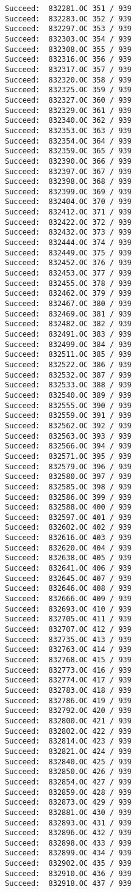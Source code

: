 \documentclass[11pt]{article}
\begin{document}
\begin{verbatim}
Succeed:  832281.OC 351 / 939
Succeed:  832283.OC 352 / 939
Succeed:  832297.OC 353 / 939
Succeed:  832303.OC 354 / 939
Succeed:  832308.OC 355 / 939
Succeed:  832316.OC 356 / 939
Succeed:  832317.OC 357 / 939
Succeed:  832320.OC 358 / 939
Succeed:  832325.OC 359 / 939
Succeed:  832327.OC 360 / 939
Succeed:  832329.OC 361 / 939
Succeed:  832340.OC 362 / 939
Succeed:  832353.OC 363 / 939
Succeed:  832354.OC 364 / 939
Succeed:  832359.OC 365 / 939
Succeed:  832390.OC 366 / 939
Succeed:  832397.OC 367 / 939
Succeed:  832398.OC 368 / 939
Succeed:  832399.OC 369 / 939
Succeed:  832404.OC 370 / 939
Succeed:  832412.OC 371 / 939
Succeed:  832422.OC 372 / 939
Succeed:  832432.OC 373 / 939
Succeed:  832444.OC 374 / 939
Succeed:  832449.OC 375 / 939
Succeed:  832452.OC 376 / 939
Succeed:  832453.OC 377 / 939
Succeed:  832455.OC 378 / 939
Succeed:  832462.OC 379 / 939
Succeed:  832467.OC 380 / 939
Succeed:  832469.OC 381 / 939
Succeed:  832482.OC 382 / 939
Succeed:  832491.OC 383 / 939
Succeed:  832499.OC 384 / 939
Succeed:  832511.OC 385 / 939
Succeed:  832522.OC 386 / 939
Succeed:  832532.OC 387 / 939
Succeed:  832533.OC 388 / 939
Succeed:  832540.OC 389 / 939
Succeed:  832555.OC 390 / 939
Succeed:  832559.OC 391 / 939
Succeed:  832562.OC 392 / 939
Succeed:  832563.OC 393 / 939
Succeed:  832566.OC 394 / 939
Succeed:  832571.OC 395 / 939
Succeed:  832579.OC 396 / 939
Succeed:  832580.OC 397 / 939
Succeed:  832585.OC 398 / 939
Succeed:  832586.OC 399 / 939
Succeed:  832588.OC 400 / 939
Succeed:  832597.OC 401 / 939
Succeed:  832602.OC 402 / 939
Succeed:  832616.OC 403 / 939
Succeed:  832620.OC 404 / 939
Succeed:  832638.OC 405 / 939
Succeed:  832641.OC 406 / 939
Succeed:  832645.OC 407 / 939
Succeed:  832646.OC 408 / 939
Succeed:  832666.OC 409 / 939
Succeed:  832693.OC 410 / 939
Succeed:  832705.OC 411 / 939
Succeed:  832707.OC 412 / 939
Succeed:  832735.OC 413 / 939
Succeed:  832763.OC 414 / 939
Succeed:  832768.OC 415 / 939
Succeed:  832773.OC 416 / 939
Succeed:  832774.OC 417 / 939
Succeed:  832783.OC 418 / 939
Succeed:  832786.OC 419 / 939
Succeed:  832792.OC 420 / 939
Succeed:  832800.OC 421 / 939
Succeed:  832802.OC 422 / 939
Succeed:  832814.OC 423 / 939
Succeed:  832821.OC 424 / 939
Succeed:  832840.OC 425 / 939
Succeed:  832850.OC 426 / 939
Succeed:  832854.OC 427 / 939
Succeed:  832859.OC 428 / 939
Succeed:  832873.OC 429 / 939
Succeed:  832881.OC 430 / 939
Succeed:  832893.OC 431 / 939
Succeed:  832896.OC 432 / 939
Succeed:  832898.OC 433 / 939
Succeed:  832899.OC 434 / 939
Succeed:  832902.OC 435 / 939
Succeed:  832910.OC 436 / 939
Succeed:  832918.OC 437 / 939

\end{verbatim}
\end{document}
